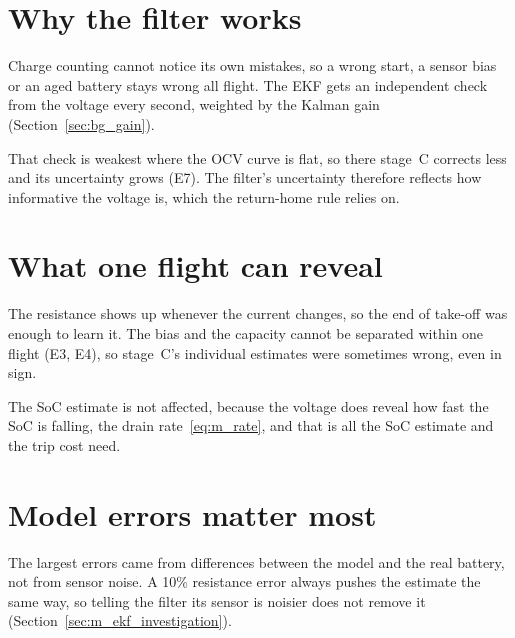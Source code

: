 
\section{Why the filter works}\label{sec:d_why}

Charge counting cannot notice its own mistakes, so a wrong start, a sensor bias or an aged battery stays wrong all flight. The EKF gets an independent check from the voltage every second, weighted by the Kalman gain (Section~\ref{sec:bg_gain}).

That check is weakest where the OCV curve is flat, so there stage~C corrects less and its uncertainty grows (E7). The filter's uncertainty therefore reflects how informative the voltage is, which the return-home rule relies on.

\section{What one flight can reveal}\label{sec:d_observability}

The resistance shows up whenever the current changes, so the end of take-off was enough to learn it. The bias and the capacity cannot be separated within one flight (E3, E4), so stage~C's individual estimates were sometimes wrong, even in sign.

The SoC estimate is not affected, because the voltage does reveal how fast the SoC is falling, the drain rate~\eqref{eq:m_rate}, and that is all the SoC estimate and the trip cost need.

\section{Model errors matter most}\label{sec:d_mismatch}

The largest errors came from differences between the model and the real battery, not from sensor noise. A 10\% resistance error always pushes the estimate the same way, so telling the filter its sensor is noisier does not remove it (Section~\ref{sec:m_ekf_investigation}).

